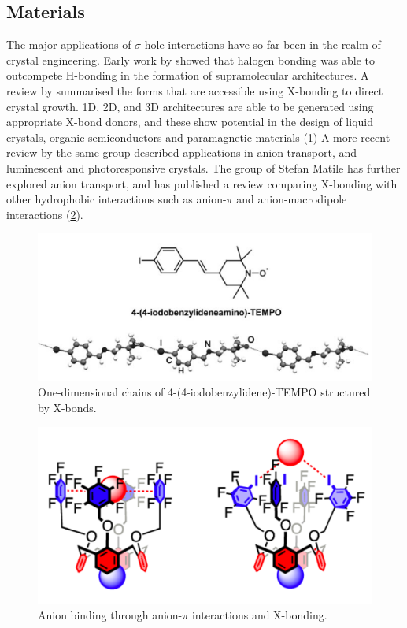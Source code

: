 \begin{refsection}
\subsection{Materials}
The major applications of $\sigma$-hole interactions have so far been in the realm of crystal engineering.
Early work by \citeauthor{Corradi2000} showed that halogen bonding was able to outcompete H-bonding in the formation of supramolecular architectures.\autocite{Corradi2000}
A review by \citeauthor{Metrangolo2008} summarised the forms that are accessible using X-bonding to direct crystal growth.\autocite{Metrangolo2008}
1D, 2D, and 3D architectures are able to be generated using appropriate X-bond donors, and these show potential in the design of liquid crystals, organic semiconductors and paramagnetic materials (\cref{fig:iodotempo-chains})
A more recent review by the same group described applications in anion transport, and luminescent and photoresponsive crystals.\autocite{Priimagi2013}
The group of Stefan Matile has further explored anion transport, and has published a review comparing X-bonding with other hydrophobic interactions such as anion-$\pi$ and anion-macrodipole interactions (\cref{fig:matile-anion-binder}).\autocite{VargasJentzsch2013}

\begin{figure}
    \centering
    \includegraphics[width=0.6\linewidth]{Figures/iodotempo-chains.pdf}
    \caption{One-dimensional chains of 4-(4-iodobenzylidene)-TEMPO structured by X-bonds.\autocite{Metrangolo2008}}
    \label{fig:iodotempo-chains}
\end{figure}

\begin{figure}
    \centering
    \includegraphics[width=0.4\linewidth]{Figures/matile-anion-binder.pdf}
    \caption{Anion binding through anion-$\pi$ interactions and X-bonding.\autocite{VargasJentzsch2013}}
    \label{fig:matile-anion-binder}
\end{figure}


\end{refsection}
